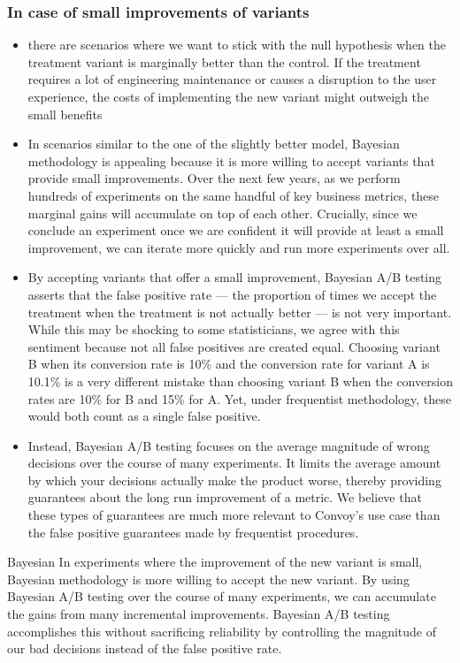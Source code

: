 \documentclass{beamer}
\begin{document}
\begin{frame}[allowframebreaks]\frametitle{In case of small improvements of variants}
	\begin{itemize}
		\item  there are scenarios where we want to stick with the null hypothesis when the treatment variant is marginally better than the control. If the treatment requires a lot of engineering maintenance or causes a disruption to the user experience, the costs of implementing the new variant might outweigh the small benefits
		\item In scenarios similar to the one of the slightly better model, Bayesian methodology is appealing because it is more willing to accept variants that provide small improvements. Over the next few years, as we perform hundreds of experiments on the same handful of key business metrics, these marginal gains will accumulate on top of each other. Crucially, since we conclude an experiment once we are confident it will provide at least a small improvement, we can iterate more quickly and run more experiments over all.
		\item By accepting variants that offer a small improvement, Bayesian A/B testing asserts that the false positive rate — the proportion of times we accept the treatment when the treatment is not actually better — is not very important. While this may be shocking to some statisticians, we agree with this sentiment because not all false positives are created equal. Choosing variant B when its conversion rate is 10\% and the conversion rate for variant A is 10.1\% is a very different mistake than choosing variant B when the conversion rates are 10\% for B and 15\% for A. Yet, under frequentist methodology, these would both count as a single false positive.
		\item Instead, Bayesian A/B testing focuses on the average magnitude of wrong decisions over the course of many experiments. It limits the average amount by which your decisions actually make the product worse, thereby providing guarantees about the long run improvement of a metric. We believe that these types of guarantees are much more relevant to Convoy’s use case than the false positive guarantees made by frequentist procedures.
	\end{itemize}

	\begin{block}{Bayesian} %
		{\tiny In experiments where the improvement of the new variant is small, Bayesian methodology is more willing to accept the new variant. By using Bayesian A/B testing over the course of many experiments, we can accumulate the gains from many incremental improvements. Bayesian A/B testing accomplishes this without sacrificing reliability by controlling the magnitude of our bad decisions instead of the false positive rate.}
	\end{block}

\end{frame}
\end{document}
